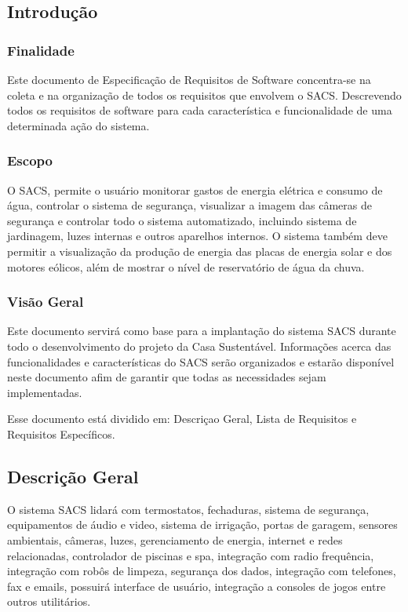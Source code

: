\subsection{Introdução}
\subsubsection{Finalidade}
	Este documento de Especificação de Requisitos de Software concentra-se na coleta e na organização de todos os requisitos que envolvem o \gls{SACS}. Descrevendo todos os requisitos de software para cada característica e funcionalidade de uma determinada ação do sistema.

\subsubsection{Escopo}

	O \gls{SACS}, permite o usuário monitorar gastos de energia elétrica e consumo de água, controlar o sistema de segurança, visualizar a imagem das câmeras de segurança e controlar todo o sistema automatizado, incluindo sistema de jardinagem, luzes internas e outros aparelhos internos. O sistema também deve permitir a visualização da produção de energia das placas de energia solar e dos motores eólicos, além de mostrar o nível de reservatório de água da chuva.

\subsubsection{Visão Geral}

	Este documento servirá como base para a implantação do sistema SACS durante todo o desenvolvimento do projeto da Casa Sustentável. Informações acerca das funcionalidades e características do SACS serão organizados e estarão disponível neste documento afim de garantir que todas as necessidades sejam implementadas.
	
	Esse documento está dividido em: Descriçao Geral, Lista de Requisitos e Requisitos Específicos.

\subsection{Descrição Geral}

	O sistema \gls{SACS} lidará com termostatos, fechaduras, sistema de segurança, equipamentos de áudio e video, sistema de irrigação, portas de garagem, sensores ambientais, câmeras, luzes, gerenciamento de energia, internet e redes relacionadas, controlador de piscinas e spa, integração com radio frequência, integração com robôs de limpeza, segurança dos dados, integração com telefones, fax e emails, possuirá interface de usuário, integração a consoles de jogos entre outros utilitários.

